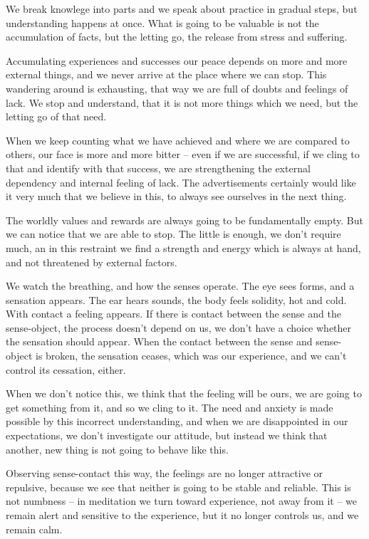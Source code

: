 We break knowlege into parts and we speak about practice in gradual
steps, but understanding happens at once. What is going to be valuable
is not the accumulation of facts, but the letting go, the release from
stress and suffering.

Accumulating experiences and successes our peace depends on more and
more external things, and we never arrive at the place where we can
stop. This wandering around is exhausting, that way we are full of
doubts and feelings of lack. We stop and understand, that it is not more
things which we need, but the letting go of that need.

When we keep counting what we have achieved and where we are compared to
others, our face is more and more bitter -- even if we are successful,
if we cling to that and identify with that success, we are strengthening
the external dependency and internal feeling of lack. The advertisements
certainly would like it very much that we believe in this, to always see
ourselves in the next thing.

The worldly values and rewards are always going to be fundamentally
empty. But we can notice that we are able to stop. The little is enough,
we don't require much, an in this restraint we find a strength and
energy which is always at hand, and not threatened by external factors.

We watch the breathing, and how the senses operate. The eye sees forms,
and a sensation appears. The ear hears sounds, the body feels solidity,
hot and cold. With contact a feeling appears. If there is contact
between the sense and the sense-object, the process doesn't depend on
us, we don't have a choice whether the sensation should appear. When the
contact between the sense and sense-object is broken, the sensation
ceases, which was our experience, and we can't control its cessation,
either.

When we don't notice this, we think that the feeling will be ours, we
are going to get something from it, and so we cling to it. The need and
anxiety is made possible by this incorrect understanding, and when we
are disappointed in our expectations, we don't investigate our attitude,
but instead we think that another, new thing is not going to behave like
this.

Observing sense-contact this way, the feelings are no longer attractive
or repulsive, because we see that neither is going to be stable and
reliable. This is not numbness -- in meditation we turn toward
experience, not away from it -- we remain alert and sensitive to the
experience, but it no longer controls us, and we remain calm.

